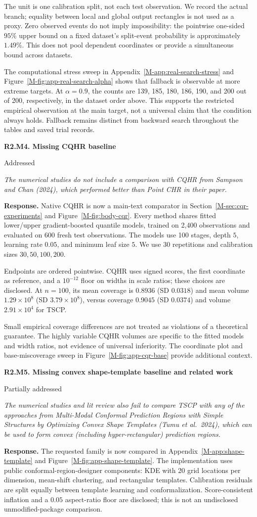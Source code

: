 \documentclass[11pt]{article}
\newcommand{\mssec}[1]{Section~\ref*{M-#1}}
\newcommand{\msapp}[1]{Appendix~\ref*{M-#1}}
\newcommand{\msfig}[1]{Figure~\ref*{M-#1}}
\newcommand{\point}[3]{\par\Needspace{7\baselineskip}\medskip
\noindent\parbox[t]{0.77\linewidth}{\textbf{#1}}\hfill
\parbox[t]{0.21\linewidth}{\raggedleft\small\sffamily #2}\par\nopagebreak
{\color{ReviewerBlue}\small\itshape #3\par}\textbf{Response.} }
\begin{document}
The unit is one calibration split, not each test observation. We record the actual branch; equality between local and global output rectangles is not used as a proxy. Zero observed events do not imply impossibility: the pointwise one-sided $95\%$ upper bound on a fixed dataset's split-event probability is approximately $1.49\%$. This does not pool dependent coordinates or provide a simultaneous bound across datasets.

The computational stress sweep in \msapp{app:real-search-stress} and \msfig{fig:app-real-search-alpha} shows that fallback is observable at more extreme targets. At $\alpha=0.9$, the counts are 139, 185, 180, 186, 190, and 200 out of 200, respectively, in the dataset order above. This supports the restricted empirical observation at the main target, not a universal claim that the condition always holds. Fallback remains distinct from backward search throughout the tables and saved trial records.

\point{R2.M4. Missing CQHR baseline}{Addressed}{The numerical studies do not include a comparison with CQHR from
Sampson and Chan (2024), which performed better than Point CHR in
their paper.}
\label{response:R2.M4}
Native CQHR is now a main-text comparator in \mssec{sec:cqr-experiments} and \msfig{fig:body-cqr}. Every method shares fitted lower/upper gradient-boosted quantile models, trained on 2,400 observations and evaluated on 600 fresh test observations. The models use 100 stages, depth $5$, learning rate $0.05$, and minimum leaf size $5$. We use 30 repetitions and calibration sizes $30,50,100,200$.

Endpoints are ordered pointwise. CQHR uses signed scores, the first coordinate as reference, and a $10^{-12}$ floor on widths in scale ratios; these choices are disclosed. At $n=100$, its mean coverage is $0.8936$ (SD $0.0318$) and mean volume $1.29\times10^8$ (SD $3.79\times10^8$), versus coverage $0.9045$ (SD $0.0374$) and volume $2.91\times10^4$ for TSCP.

Small empirical coverage differences are not treated as violations of a theoretical guarantee. The highly variable CQHR volumes are specific to the fitted models and width ratios, not evidence of universal inferiority. The coordinate plot and base-miscoverage sweep in \msfig{fig:app-cqr-base} provide additional context.

\point{R2.M5. Missing convex shape-template baseline and related work}{Partially addressed}{The numerical studies and lit review also fail to compare TSCP with
any of the approaches from Multi-Modal Conformal Prediction Regions
with Simple Structures by Optimizing Convex Shape Templates
(Tumu et al.\ 2024), which can be used to form convex (including
hyper-rectangular) prediction regions.}
\label{response:R2.M5}
The requested family is now compared in \msapp{app:shape-template} and \msfig{fig:app-shape-template}. The implementation uses public conformal-region-designer components: KDE with 20 grid locations per dimension, mean-shift clustering, and rectangular templates. Calibration residuals are split equally between template learning and conformalization. Score-consistent inflation and a $0.05$ aspect-ratio floor are disclosed; this is not an undisclosed unmodified-package comparison.
\end{document}
